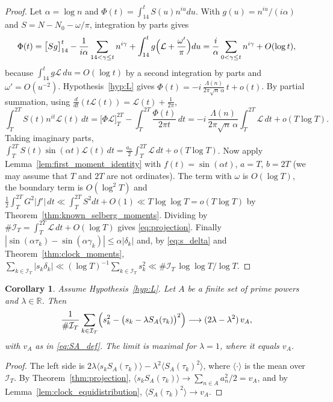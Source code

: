 \documentclass[11pt,reqno]{amsart}
\theoremstyle{plain}\newtheorem{theorem}{Theorem}[section]\newtheorem{proposition}[theorem]{Proposition}\newtheorem{lemma}[theorem]{Lemma}\newtheorem{corollary}[theorem]{Corollary}
\theoremstyle{definition}\newtheorem{hypothesis}[theorem]{Hypothesis}\newtheorem{definition}[theorem]{Definition}
\theoremstyle{remark}\newtheorem{remark}[theorem]{Remark}\newtheorem{experiment}[theorem]{Experiment}\newtheorem{question}[theorem]{Question}\newtheorem{heuristic}[theorem]{Heuristic}\newtheorem{conjecture}[theorem]{Conjecture}
\newcommand{\NO}{N_0}\newcommand{\lL}{\mathcal L}\newcommand{\IT}{\mathcal I_T}\newcommand{\R}{\mathbb R}\newcommand{\N}{\mathbb N}\newcommand{\eps}{\varepsilon}\newcommand{\sgn}{\operatorname{sgn}}
\begin{document}
\begin{proof}
Let $\alpha=\log n$ and $\Phi(t)=\int_{14}^tS(u)n^{iu}du$. With $g(u)=n^{iu}/(i\alpha)$ and $S=N-\NO-\omega/\pi$, integration by parts gives
\begin{equation}
\Phi(t)=\bigl[Sg\bigr]_{14}^t-\frac1{i\alpha}\sum_{14<\gamma\le t}n^{i\gamma}+\int_{14}^tg\Bigl(\lL+\frac{\omega'}\pi\Bigr)du=\frac i\alpha\sum_{0<\gamma\le t}n^{i\gamma}+O(\log t),
\label{eq:projection_Phi}
\end{equation}
because $\int_{14}^tg\lL\,du=O(\log t)$ by a second integration by parts and $\omega'=O(u^{-2})$. Hypothesis~\ref{hyp:L} gives $\Phi(t)=-i\,\frac{\Lambda(n)}{2\pi\sqrt n\,\alpha}\,t+o(t)$. By partial summation, using $\frac{d}{dt}(t\lL(t))=\lL(t)+\frac1{2\pi}$,
\begin{equation}
\int_T^{2T}S(t)n^{it}\lL(t)\,dt=\bigl[\Phi\lL\bigr]_T^{2T}-\int_T^{2T}\frac{\Phi(t)}{2\pi t}\,dt=-i\,\frac{\Lambda(n)}{2\pi\sqrt n\,\alpha}\int_T^{2T}\lL\,dt+o(T\log T).
\label{eq:projection_partial}
\end{equation}
Taking imaginary parts, $\int_T^{2T}S(t)\sin(\alpha t)\lL(t)\,dt=\frac{a_n}2\int_T^{2T}\lL\,dt+o(T\log T)$. Now apply Lemma~\ref{lem:first_moment_identity} with $f(t)=\sin(\alpha t)$, $a=T$, $b=2T$ (we may assume that $T$ and $2T$ are not ordinates). The term with $\omega$ is $O(\log T)$, the boundary term is $O(\log^2T)$ and $\frac12\int_T^{2T}G^2|f'|\,dt\ll\int_T^{2T}S^2dt+O(1)\ll T\log\log T=o(T\log T)$ by Theorem~\ref{thm:known_selberg_moments}. Dividing by $\#\IT=\int_T^{2T}\lL\,dt+O(\log T)$ gives \eqref{eq:projection}. Finally $|\sin(\alpha\tau_k)-\sin(\alpha\gamma_k)|\le\alpha|\delta_k|$ and, by \eqref{eq:s_delta} and Theorem~\ref{thm:clock_moments}, $\sum_{k\in\IT}|s_k\delta_k|\ll(\log T)^{-1}\sum_{k\in\IT}s_k^2\ll\#\IT\,\log\log T/\log T$.
\end{proof}

\begin{corollary}\label{cor:gain}
Assume Hypothesis~\ref{hyp:L}. Let $A$ be a finite set of prime powers and $\lambda\in\R$. Then
\begin{equation}
\frac1{\#\IT}\sum_{k\in\IT}\Bigl(s_k^2-\bigl(s_k-\lambda S_A(\tau_k)\bigr)^2\Bigr)\longrightarrow(2\lambda-\lambda^2)\,v_A ,
\label{eq:gain}
\end{equation}
with $v_A$ as in \eqref{eq:SA_def}. The limit is maximal for $\lambda=1$, where it equals $v_A$.
\end{corollary}

\begin{proof}
The left side is $2\lambda\langle s_kS_A(\tau_k)\rangle-\lambda^2\langle S_A(\tau_k)^2\rangle$, where $\langle\cdot\rangle$ is the mean over $\IT$. By Theorem~\ref{thm:projection}, $\langle s_kS_A(\tau_k)\rangle\to\sum_{n\in A}a_n^2/2=v_A$, and by Lemma~\ref{lem:clock_equidistribution}, $\langle S_A(\tau_k)^2\rangle\to v_A$.
\end{proof}
\end{document}
